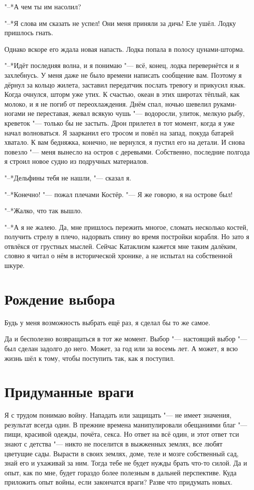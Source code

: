 "--*А чем ты им насолил?

"--*Я слова им сказать не успел!
Они меня приняли за дичь!
Еле ушёл.
Лодку пришлось гнать.

Однако вскоре его ждала новая напасть.
Лодка попала в полосу цунами-шторма.

"--*Идёт последняя волна, и я понимаю "--- всё, конец, лодка перевернётся и я захлебнусь.
У меня даже не было времени написать сообщение вам.
Поэтому я дёрнул за кольцо жилета, заставил передатчик послать тревогу и прикусил язык.
Когда очнулся, шторм уже утих.
К счастью, океан в этих широтах тёплый, как молоко, и я не погиб от переохлаждения.
Днём спал, ночью шевелил руками-ногами не переставая, жевал всякую чушь "--- водоросли, улиток, мелкую рыбу, креветок "--- только бы не застыть.
Дрон прилетел в тот момент, когда я уже начал волноваться.
Я заарканил его тросом и повёл на запад, покуда батарей хватало.
К вам бедняжка, конечно, не вернулся, я пустил его на детали.
И снова повезло "--- меня вынесло на остров с деревьями.
Собственно, последние полгода я строил новое судно из подручных материалов.

"--*Дельфины тебя не нашли, "--- сказал я.

"--*Конечно! "--- пожал плечами Костёр.
"--- Я же говорю, я на острове был!

"--*Жалко, что так вышло.

"--*А я не жалею.
Да, мне пришлось пережить многое, сломать несколько костей, получить стрелу в плечо, надорвать спину во время постройки корабля.
Но зато я отвлёкся от грустных мыслей.
Сейчас Катаклизм кажется мне таким далёким, словно я читал о нём в исторической хронике, а не испытал на собственной шкуре.

\section{Рождение выбора}

Будь у меня возможность выбрать ещё раз, я сделал бы то же самое.

Да и бесполезно возвращаться в тот же момент.
Выбор "--- настоящий выбор "--- был сделан задолго до него.
Может, за год или за восемь лет.
А может, я всю жизнь шёл к тому, чтобы поступить так, как я поступил.

\section{Придуманные враги}

Я с трудом понимаю войну.
Нападать или защищать "--- не имеет значения, результат всегда один.
В прежние времена манипулировали обещаниями благ "--- пищи, красивой одежды, почёта, секса.
Но ответ на всё один, и этот ответ тси знают с детства "--- никто не поселится в выжженных землях, все любят цветущие сады.
Вырасти в своих землях, доме, теле и мозге собственный сад, знай его и ухаживай за ним.
Тогда тебе не будет нужды брать что-то силой.
Да и опыт, как по мне, будет гораздо более полезным в дальней перспективе.
Куда приложить опыт войны, если закончатся враги?
Разве что придумать новых.

